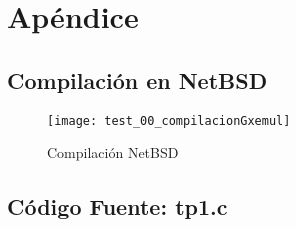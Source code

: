 \documentclass[a4paper,10pt]{article}
\begin{document}
\newpage
\section{Apéndice}
\subsection{Compilación en NetBSD}

\begin{figure}[!htp]
\begin{center}
\texttt{[image: test\_00\_compilacionGxemul]}
\end{center}
\caption{Compilación NetBSD} \label{fig006}
\end{figure}

\subsection{Código Fuente: tp1.c}

\end{document}
